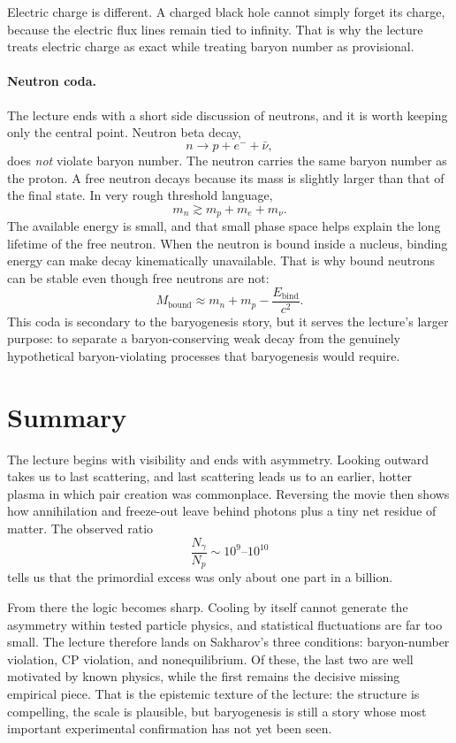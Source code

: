 Electric charge is different. A charged black hole cannot simply forget its charge, because the electric flux lines remain tied to infinity. That is why the lecture treats electric charge as exact while treating baryon number as provisional.

\paragraph{Neutron coda.} The lecture ends with a short side discussion of neutrons, and it is worth keeping only the central point. Neutron beta decay,
\begin{equation}
n \to p + e^- + \bar\nu,
\end{equation}
does \emph{not} violate baryon number. The neutron carries the same baryon number as the proton. A free neutron decays because its mass is slightly larger than that of the final state. In very rough threshold language,
\begin{equation}
m_n \gtrsim m_p + m_e + m_\nu.
\end{equation}
The available energy is small, and that small phase space helps explain the long lifetime of the free neutron. When the neutron is bound inside a nucleus, binding energy can make decay kinematically unavailable. That is why bound neutrons can be stable even though free neutrons are not:
\begin{equation}
M_{\mathrm{bound}} \approx m_n + m_p - \frac{E_{\mathrm{bind}}}{c^2}.
\end{equation}
This coda is secondary to the baryogenesis story, but it serves the lecture's larger purpose: to separate a baryon-conserving weak decay from the genuinely hypothetical baryon-violating processes that baryogenesis would require.

\section{Summary}

The lecture begins with visibility and ends with asymmetry. Looking outward takes us to last scattering, and last scattering leads us to an earlier, hotter plasma in which pair creation was commonplace. Reversing the movie then shows how annihilation and freeze-out leave behind photons plus a tiny net residue of matter. The observed ratio
\[
\frac{N_\gamma}{N_p}\sim 10^9\text{--}10^{10}
\]
tells us that the primordial excess was only about one part in a billion.

From there the logic becomes sharp. Cooling by itself cannot generate the asymmetry within tested particle physics, and statistical fluctuations are far too small. The lecture therefore lands on Sakharov's three conditions: baryon-number violation, CP violation, and nonequilibrium. Of these, the last two are well motivated by known physics, while the first remains the decisive missing empirical piece. That is the epistemic texture of the lecture: the structure is compelling, the scale is plausible, but baryogenesis is still a story whose most important experimental confirmation has not yet been seen.